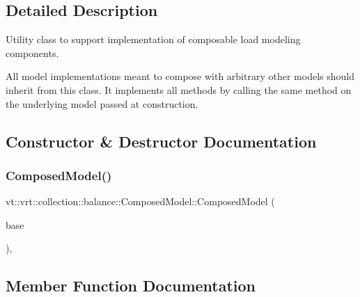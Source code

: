 \subsection{Detailed Description}
Utility class to support implementation of composable load modeling components. 

All model implementations meant to compose with arbitrary other models should inherit from this class. It implements all methods by calling the same method on the underlying model passed at construction. 

\subsection{Constructor \& Destructor Documentation}
\mbox{\label{classvt_1_1vrt_1_1collection_1_1balance_1_1_composed_model_a84b77c1fceb9e07a0706b896a4d9e9c9}} 
\subsubsection{\texorpdfstring{Composed\+Model()}{ComposedModel()}}
{\footnotesize\ttfamily vt\+::vrt\+::collection\+::balance\+::\+Composed\+Model\+::\+Composed\+Model (\begin{DoxyParamCaption}\item[{std\+::shared\+\_\+ptr$<$ \hyperlink{structvt_1_1vrt_1_1collection_1_1balance_1_1_load_model}{Load\+Model} $>$}]{base }\end{DoxyParamCaption})\hspace{0.3cm}{\ttfamily [inline]}, {\ttfamily [explicit]}}



\subsection{Member Function Documentation}
\mbox{\label{classvt_1_1vrt_1_1collection_1_1balance_1_1_composed_model_a7d32b6f8a0ca5970674238325df11783}} 
